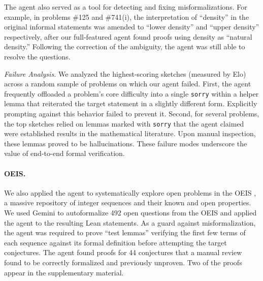 
The agent also served as a tool for detecting and fixing misformalizations. For example, in {\erdos} problems \#125 and \#741(i), the interpretation of ``density'' in the original informal statements was amended to ``lower density'' and ``upper density'' respectively, after our full-featured agent found proofs using density as ``natural density.'' Following the correction of the ambiguity, the agent was still able to resolve the questions.

\noindent \textit{Failure Analysis.} We analyzed the highest-scoring sketches (measured by Elo) across a random sample of problems on which our agent failed. First, the agent frequently offloaded a problem's core difficulty into a single \texttt{sorry} within a helper lemma that reiterated the target statement in a slightly different form. Explicitly prompting against this behavior failed to prevent it. Second, for several problems, the top sketches relied on lemmas marked with \texttt{sorry} that the agent claimed were established results in the mathematical literature. Upon manual inspection, these lemmas proved to be hallucinations. These failure modes underscore the value of end-to-end formal verification.

\paragraph{OEIS.} We also applied the agent to systematically explore open problems in the OEIS \cite{oeis}, a massive repository of integer sequences and their known and open properties. We used Gemini to autoformalize 492 open questions from the OEIS and applied the agent to the resulting Lean statements. As a guard against misformalization, the agent was required to prove ``test lemmas'' verifying the first few terms of each sequence against its formal definition before attempting the target conjectures. The agent found proofs for 44 conjectures that a manual review found to be correctly formalized and previously unproven. Two of the proofs appear in the supplementary material.

